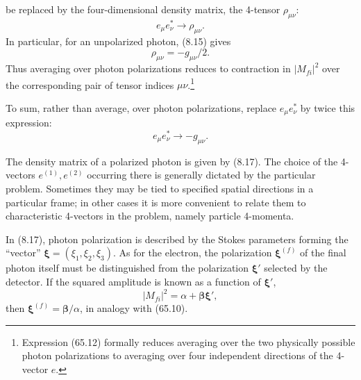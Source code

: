 be replaced by the four-dimensional density matrix, the 4-tensor $\rho_{\mu\nu}$:
\begin{equation}
e_\mu e_\nu^*\to\rho_{\mu\nu}.
\tag{65.11}
\end{equation}
In particular, for an unpolarized photon, (8.15) gives
\begin{equation}
\rho_{\mu\nu}=-g_{\mu\nu}/2.
\tag{65.12}
\end{equation}
Thus averaging over photon polarizations reduces to contraction in $|M_{fi}|^2$ over the corresponding pair of tensor indices $\mu\nu$.\footnote{Expression (65.12) formally reduces averaging over the two physically possible photon polarizations to averaging over four independent directions of the 4-vector $e$.}

To sum, rather than average, over photon polarizations, replace $e_\mu e_\nu^*$ by twice this expression:
\begin{equation}
e_\mu e_\nu^*\to-g_{\mu\nu}.
\tag{65.13}
\end{equation}

The density matrix of a polarized photon is given by (8.17). The choice of the 4-vectors $e^{(1)},e^{(2)}$ occurring there is generally dictated by the particular problem. Sometimes they may be tied to specified spatial directions in a particular frame; in other cases it is more convenient to relate them to characteristic 4-vectors in the problem, namely particle 4-momenta.

In (8.17), photon polarization is described by the Stokes parameters forming the ``vector'' $\boldsymbol\xi=(\xi_1,\xi_2,\xi_3)$. As for the electron, the polarization $\boldsymbol\xi^{(f)}$ of the final photon itself must be distinguished from the polarization $\boldsymbol\xi'$ selected by the detector. If the squared amplitude is known as a function of $\boldsymbol\xi'$,
\[
|M_{fi}|^2=\alpha+\boldsymbol\beta\boldsymbol\xi',
\]
then $\boldsymbol\xi^{(f)}=\boldsymbol\beta/\alpha$, in analogy with (65.10).
